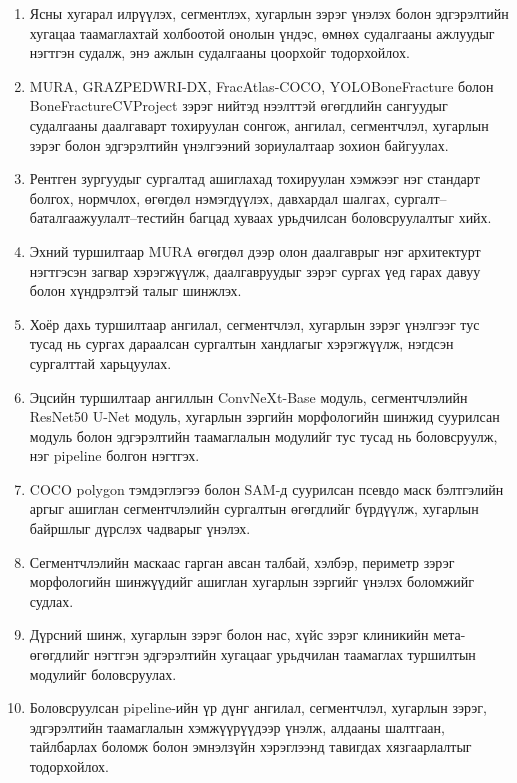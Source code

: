 \begin{enumerate}[nosep]
    \item Ясны хугарал илрүүлэх, сегментлэх, хугарлын зэрэг үнэлэх болон эдгэрэлтийн хугацаа таамаглахтай холбоотой онолын үндэс, өмнөх судалгааны ажлуудыг нэгтгэн судалж, энэ ажлын судалгааны цоорхойг тодорхойлох.
    \item MURA, GRAZPEDWRI-DX, FracAtlas-COCO, YOLOBoneFracture болон BoneFractureCVProject зэрэг нийтэд нээлттэй өгөгдлийн сангуудыг судалгааны даалгаварт тохируулан сонгож, ангилал, сегментчлэл, хугарлын зэрэг болон эдгэрэлтийн үнэлгээний зориулалтаар зохион байгуулах.
    \item Рентген зургуудыг сургалтад ашиглахад тохируулан хэмжээг нэг стандарт болгох, нормчлох, өгөгдөл нэмэгдүүлэх, давхардал шалгах, сургалт--баталгаажуулалт--тестийн багцад хуваах урьдчилсан боловсруулалтыг хийх.
    \item Эхний туршилтаар MURA өгөгдөл дээр олон даалгаврыг нэг архитектурт нэгтгэсэн загвар хэрэгжүүлж, даалгавруудыг зэрэг сургах үед гарах давуу болон хүндрэлтэй талыг шинжлэх.
    \item Хоёр дахь туршилтаар ангилал, сегментчлэл, хугарлын зэрэг үнэлгээг тус тусад нь сургах дараалсан сургалтын хандлагыг хэрэгжүүлж, нэгдсэн сургалттай харьцуулах.
    \item Эцсийн туршилтаар ангиллын ConvNeXt-Base модуль, сегментчлэлийн ResNet50 U-Net модуль, хугарлын зэргийн морфологийн шинжид суурилсан модуль болон эдгэрэлтийн таамаглалын модулийг тус тусад нь боловсруулж, нэг pipeline болгон нэгтгэх.
    \item COCO polygon тэмдэглэгээ болон SAM-д суурилсан псевдо маск бэлтгэлийн аргыг ашиглан сегментчлэлийн сургалтын өгөгдлийг бүрдүүлж, хугарлын байршлыг дүрслэх чадварыг үнэлэх.
    \item Сегментчлэлийн маскаас гарган авсан талбай, хэлбэр, периметр зэрэг морфологийн шинжүүдийг ашиглан хугарлын зэргийг үнэлэх боломжийг судлах.
    \item Дүрсний шинж, хугарлын зэрэг болон нас, хүйс зэрэг клиникийн мета-өгөгдлийг нэгтгэн эдгэрэлтийн хугацааг урьдчилан таамаглах туршилтын модулийг боловсруулах.
    \item Боловсруулсан pipeline-ийн үр дүнг ангилал, сегментчлэл, хугарлын зэрэг, эдгэрэлтийн таамаглалын хэмжүүрүүдээр үнэлж, алдааны шалтгаан, тайлбарлах боломж болон эмнэлзүйн хэрэглээнд тавигдах хязгаарлалтыг тодорхойлох.
\end{enumerate}


